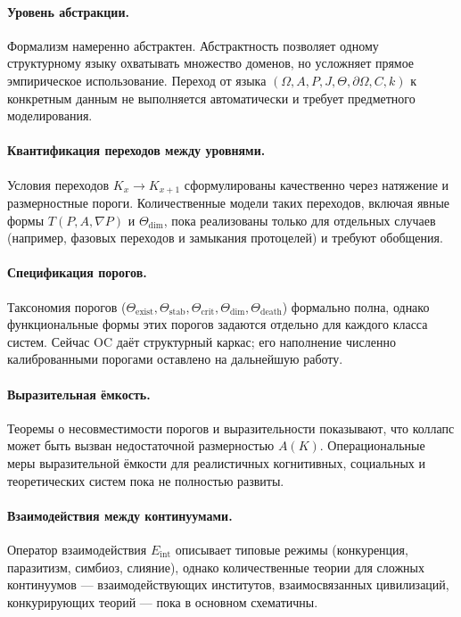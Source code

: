 \paragraph{Уровень абстракции.}
Формализм намеренно абстрактен. Абстрактность позволяет одному структурному языку
охватывать множество доменов, но усложняет прямое эмпирическое использование.
Переход от языка \((\Omega,A,P,J,\Theta,\partial\Omega,C,k)\) к конкретным данным
не выполняется автоматически и требует предметного моделирования.

\paragraph{Квантификация переходов между уровнями.}
Условия переходов \(K_x \to K_{x+1}\) сформулированы качественно через натяжение и
размерностные пороги.
Количественные модели таких переходов, включая явные формы \(T(P,A,\nabla P)\) и
\(\Theta_{\mathrm{dim}}\), пока реализованы только для отдельных случаев
(например, фазовых переходов и замыкания протоцелей) и требуют обобщения.

\paragraph{Спецификация порогов.}
Таксономия порогов (\(\Theta_{\mathrm{exist}}, \Theta_{\mathrm{stab}},
\Theta_{\mathrm{crit}}, \Theta_{\mathrm{dim}}, \Theta_{\mathrm{death}}\)) формально
полна, однако функциональные формы этих порогов задаются отдельно для каждого класса
систем.
Сейчас OC даёт структурный каркас; его наполнение численно калиброванными порогами
оставлено на дальнейшую работу.

\paragraph{Выразительная ёмкость.}
Теоремы о несовместимости порогов и выразительности показывают, что коллапс может
быть вызван недостаточной размерностью \(A(K)\).
Операциональные меры выразительной ёмкости для реалистичных когнитивных,
социальных и теоретических систем пока не полностью развиты.

\paragraph{Взаимодействия между континуумами.}
Оператор взаимодействия \(E_{\mathrm{int}}\) описывает типовые режимы
(конкуренция, паразитизм, симбиоз, слияние), однако количественные теории для
сложных континуумов — взаимодействующих институтов, взаимосвязанных цивилизаций,
конкурирующих теорий — пока в основном схематичны.

